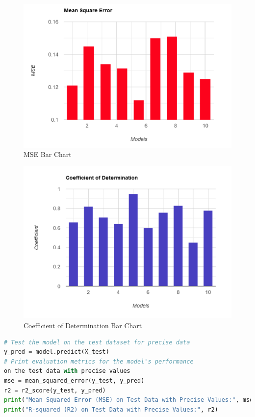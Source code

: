 \documentclass{article}
\begin{document}
\begin{figure}[H]
    \centering
    \includegraphics[width=1\linewidth]{mse.png}
    \caption{MSE Bar Chart}
    \label{fig:enter-label}
\end{figure}

\begin{figure}[H]
    \centering
    \includegraphics[width=1\linewidth]{coofdet.png}
    \caption{Coefficient of Determination Bar Chart}
    \label{fig:enter-label}
\end{figure}


\begin{lstlisting}[language=Python, caption={Model testing and error collection}, label={lst:python}]
# Test the model on the test dataset for precise data
y_pred = model.predict(X_test)
# Print evaluation metrics for the model's performance 
on the test data with precise values
mse = mean_squared_error(y_test, y_pred)
r2 = r2_score(y_test, y_pred)
print("Mean Squared Error (MSE) on Test Data with Precise Values:", mse)
print("R-squared (R2) on Test Data with Precise Values:", r2)
\end{lstlisting}
\end{document}

